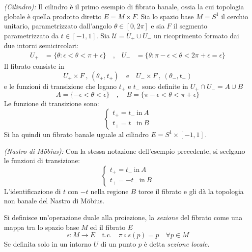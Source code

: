 \begin{example}\emph{(Cilindro): }
   Il cilindro è il primo esempio di fibrato banale, ossia la cui topologia globale
   è quella prodotto diretto $E = M\times F$. Sia lo spazio base $M=S^1$ il cerchio
   unitario, parametrizzato dall'angolo $\theta \in [0,2\pi]$ e sia $F$ il segmento
   parametrizzato da $t \in [-1,1]$. Sia $\mathcal{U} = U_+ \cup U_-$ un ricoprimento
   formato dai due intorni semicircolari:
   \begin{equation*}
      \begin{aligned}
         U_+ &= \{\theta : \epsilon < \theta < \pi + \epsilon \} \quad ,&
         U_- &= \{\theta : \pi - \epsilon < \theta < 2\pi + \epsilon = \epsilon \}
      \end{aligned}
   \end{equation*}
   Il fibrato consiste in
      $$ U_+ \times F \: , \: (\theta_+,t_+) \mathrm{\quad e \quad}
         U_- \times F \: , \: (\theta_-,t_-) $$
  e le funzioni di transizione che legano $t_+$ e $t_-$ sono definite in
  $U_+\cap U_- = A \cup B$
  $$ A = \{ -\epsilon < \theta < \epsilon \} \quad , \quad
     B = \{ \pi-\epsilon < \theta < \pi + \epsilon \} $$
  Le funzione di transizione sono:
  $$ \begin{cases}
     t_+= t_- \mathrm{\: in \:} A \\
     t_+= t_- \mathrm{\: in \:} B
  \end{cases}$$
  Si ha quindi un fibrato banale uguale al cilindro $E = S^1 \times [-1,1]$.
\end{example}

\begin{example}\emph{(Nastro di Möbius): }
   Con la stessa notazione dell'esempio precedente, si scelgano le funzioni di
   transizione:
   $$ \begin{cases}
      t_+= t_- \mathrm{\: in \:} A \\
      t_+= -t_- \mathrm{\: in \:} B
   \end{cases}$$
   L'identificazione di $t$ con $-t$ nella regione $B$ torce il fibrato e gli dà
   la topologia non banale del Nastro di Möbius.
\end{example}

Si definisce un'operazione duale alla proiezione, la \emph{sezione} del fibrato
come una mappa tra lo spazio base $M$ ed il fibrato $E$
$$
s : M \to E \quad \mathrm{t.c.}\quad \pi \circ s (p) = p \quad \forall p \in M
$$
Se definita solo in un intorno $U$ di un punto $p$ è detta \emph{sezione locale.}

